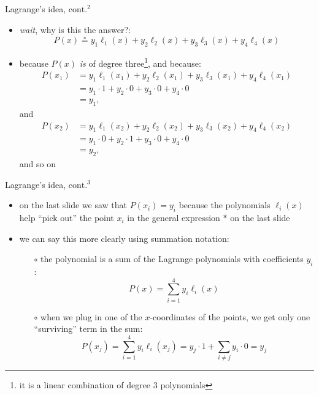 \documentclass[10pt,hyperref]{beamer}
\begin{document}
\begin{frame}{Lagrange's idea, $\text{cont.}^2$}

\begin{itemize}
\item \emph{wait}, why is this the answer?:
	$$P(x) \stackrel{\ast}{=} y_1 \ell_1(x) + y_2 \ell_2(x) + y_3 \ell_3(x) + y_4 \ell_4(x)$$
\item because $P(x)$ \emph{is} of degree three\footnote{it is a linear combination of degree 3 polynomials}, and because:
\small
\begin{align*}
P(x_1) &= y_1 \ell_1(x_1) + y_2 \ell_2(x_1) + y_3 \ell_3(x_1) + y_4 \ell_4(x_1) \\
       &= y_1 \cdot 1 + y_2 \cdot 0 + y_3 \cdot 0 + y_4 \cdot 0 \\
       &= y_1,
\end{align*}
\normalsize
and
\small
\begin{align*}
P(x_2) &= y_1 \ell_1(x_2) + y_2 \ell_2(x_2) + y_3 \ell_3(x_2) + y_4 \ell_4(x_2) \\
       &= y_1 \cdot 0 + y_2 \cdot 1 + y_3 \cdot 0 + y_4 \cdot 0 \\
       &= y_2,
\end{align*}
\normalsize
and so on
\end{itemize}
\end{frame}


\begin{frame}{Lagrange's idea, $\text{cont.}^3$}

\begin{itemize}
\item on the last slide we saw that $P(x_i)=y_i$ because the polynomials $\ell_i(x)$ help ``pick out'' the point $x_i$ in the general expression $\ast$ on the last slide
\item we can say this more clearly using summation notation:
  \begin{itemize}
  \item[$\circ$] the polynomial is a sum of the Lagrange polynomials with coefficients $y_i$:
	$$P(x) = \sum_{i=1}^4 y_i \ell_i(x)$$
  \item[$\circ$] when we plug in one of the $x$-coordinates of the points, we get only one ``surviving'' term in the sum:
	$$P(x_j) = \sum_{i=1}^4 y_i \ell_i(x_j) = y_j\cdot 1 + \sum_{i\ne j} y_i \cdot 0 = y_j$$
  
  \end{itemize}
\end{itemize}
\end{frame}
\end{document}
